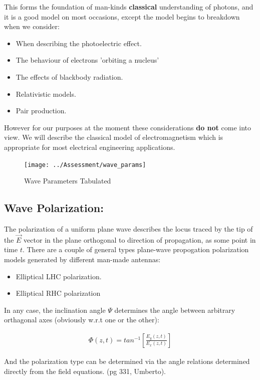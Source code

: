 \documentclass{book}
\begin{document}
 This forms the foundation of man-kinds \textbf{classical} understanding of photons, and it is a good model on most occasions, except the model begins to breakdown when we consider:

\begin{itemize}
	\item When describing the photoelectric effect.
	\item The behaviour of electrons 'orbiting a nucleus'
	\item The effects of blackbody radiation.
	\item Relativistic models.
	\item Pair production.
\end{itemize}

However for our purposes at the moment these considerations \textbf{do not} come into view. We will describe the classical model of electromagnetism which is appropriate for most electrical engineering applications.

\begin{figure}
	\centering
	\texttt{[image: ../Assessment/wave\_params]}
	\caption{Wave Parameters Tabulated	}
	\label{fig:waveparams}
\end{figure}

\subsection{Wave Polarization:}

The polarization of a uniform plane wave describes the locus traced by the tip of the $\vec{E}$ vector in the plane orthogonal to direction of propagation, as some point in time $t$. There are a couple of general types plane-wave propogation polarization models generated by different man-made antennas:

\begin{itemize}
	\item Elliptical LHC polarization.
	\item Elliptical RHC polarization
\end{itemize}

In any case, the inclination angle $\Psi$ determines the angle between arbitrary orthagonal axes (obviously w.r.t one or the other):

\begin{align*}
	\Phi(z,t) = tan^{-1}[\frac{E_y(z,t)}{E_x(z,t)}]
\end{align*}

And the polarization type can be determined via the angle relations determined directly from the field equations. (pg 331, Umberto).
\end{document}
